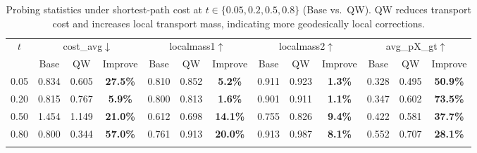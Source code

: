 \documentclass[numsec,webpdf,contemporary,large]{oup-authoring-template}%
\theoremstyle{thmstyleone}%
\theoremstyle{thmstyletwo}%
\theoremstyle{thmstylethree}%
\begin{document}
\begin{table}[t]
\centering
\caption{Probing statistics under shortest-path cost at $t\in\{0.05,0.2,0.5,0.8\}$ (Base vs.\ QW). QW reduces transport cost and increases local transport mass, indicating more geodesically local corrections.}
\renewcommand\arraystretch{1.15}
\begin{tabular*}{\textwidth}{@{\extracolsep{\fill}}c|ccc|ccc|ccc|ccc@{\extracolsep{\fill}}}
\toprule
\multirow{2}{*}{$t$} &
\multicolumn{3}{c|}{cost\_avg$\downarrow$} &
\multicolumn{3}{c|}{localmass1$\uparrow$} &
\multicolumn{3}{c|}{localmass2$\uparrow$} &
\multicolumn{3}{c}{avg\_pX\_gt$\uparrow$} \\
\cmidrule(lr){2-4}\cmidrule(lr){5-7}\cmidrule(lr){8-10}\cmidrule(lr){11-13}
& Base & QW & Improve & Base & QW & Improve & Base & QW & Improve & Base & QW & Improve \\
\midrule
0.05 & 0.834 & 0.605 & \textbf{27.5\%} & 0.810 & 0.852 & \textbf{5.2\%} & 0.911 & 0.923 & \textbf{1.3\%} & 0.328 & 0.495 & \textbf{50.9\%} \\
0.20 & 0.815 & 0.767 & \textbf{5.9\%}  & 0.800 & 0.813 & \textbf{1.6\%} & 0.901 & 0.911 & \textbf{1.1\%} & 0.347 & 0.602 & \textbf{73.5\%} \\
0.50 & 1.454 & 1.149 & \textbf{21.0\%} & 0.612 & 0.698 & \textbf{14.1\%} & 0.755 & 0.826 & \textbf{9.4\%} & 0.422 & 0.581 & \textbf{37.7\%} \\
0.80 & 0.800 & 0.344 & \textbf{57.0\%} & 0.761 & 0.913 & \textbf{20.0\%} & 0.913 & 0.987 & \textbf{8.1\%} & 0.552 & 0.707 & \textbf{28.1\%} \\
\botrule
\end{tabular*}
\label{tab:probing_short}
\end{table}
\end{document}
